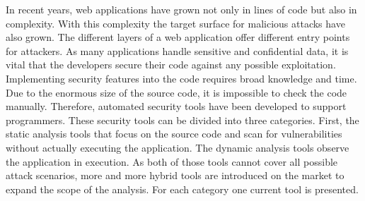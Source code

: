 In recent years, web applications have grown not only in lines of code but also in complexity. With this complexity the target surface for malicious attacks have also grown. The different layers of a web application offer different entry points for attackers. As many applications handle sensitive and confidential data, it is vital that the developers secure their code against any possible exploitation. Implementing security features into the code requires broad knowledge and time. Due to the enormous size of the source code, it is impossible to check the code manually. Therefore, automated security tools have been developed to support programmers. These security tools can be divided into three categories. First, the static analysis tools that focus on the source code and scan for vulnerabilities without actually executing the application. The dynamic analysis tools observe the application in execution. As both of those tools cannot cover all possible attack scenarios, more and more hybrid tools are introduced on the market to expand the scope of the analysis. For each category one current tool is presented.